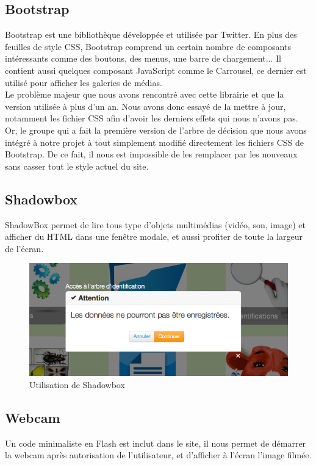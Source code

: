 \documentclass[twoside]{EPURapport}
\begin{document}
		
		\subsection{Bootstrap}
		\label{lib:bootstrap}
		Bootstrap est une bibliothèque développée et utilisée par Twitter. En plus des feuilles de style CSS, Bootstrap comprend un certain nombre de composants intéressants comme des boutons, des menus, une barre de chargement... Il contient aussi quelques composant JavaScript comme le Carrousel, ce dernier est utilisé pour  afficher les galeries de médias.\\
		
		Le problème majeur que nous avons rencontré avec cette librairie et que la version utilisée à plus d'un an. Nous avons donc essayé de la mettre à jour, notamment les fichier CSS afin d'avoir les derniers effets qui nous n'avons pas. Or, le groupe qui a fait la première version de l'arbre de décision que nous avons intégré à notre projet à tout simplement modifié directement les fichiers CSS de Bootstrap. De ce fait, il nous est impossible de les remplacer par les nouveaux sans casser tout le style actuel du site.
		
		\subsection{Shadowbox}
		\label{lib:shadowbox}
		ShadowBox permet de lire tous type d'objets multimédias (vidéo, son, image) et afficher du HTML dans une fenêtre modale, et aussi profiter de toute la largeur de l'écran.
		
		\begin{figure}[hbtp]
			\centering
			\includegraphics[scale=0.5]{images/lib-shadowbox.png}
			\caption{Utilisation de Shadowbox}
		\end{figure}
		
		\subsection{Webcam}
		\label{lib:webcam}
		Un code minimaliste en Flash est inclut dans le site, il nous permet de démarrer la webcam après autorisation de l'utilisateur, et d'afficher à l'écran l'image filmée.
		
\end{document}
